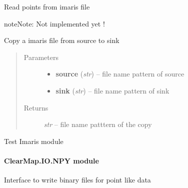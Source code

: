 \documentclass[letterpaper,10pt,english]{sphinxmanual}
\begin{document}

\begin{fulllineitems}
\label{api/ClearMap.IO:ClearMap.IO.Imaris.readPoints}
Read points from imaris file

\begin{notice}{note}{Note:}
Not implemented yet !
\end{notice}

\end{fulllineitems}


\begin{fulllineitems}
\label{api/ClearMap.IO:ClearMap.IO.Imaris.copyData}
Copy a imaris file from source to sink
\begin{quote}\begin{description}
\item[{Parameters}] \leavevmode\begin{itemize}
\item {} 
\textbf{source} (\emph{str}) --
file name pattern of source

\item {} 
\textbf{sink} (\emph{str}) --
file name pattern of sink

\end{itemize}

\item[{Returns}] \leavevmode
\emph{str} --
file name patttern of the copy

\end{description}\end{quote}

\end{fulllineitems}


\begin{fulllineitems}
\label{api/ClearMap.IO:ClearMap.IO.Imaris.test}
Test Imaris module

\end{fulllineitems}



\paragraph{ClearMap.IO.NPY module}
\label{api/ClearMap.IO:clearmap-io-npy-module}\label{api/ClearMap.IO:module-ClearMap.IO.NPY}
Interface to write binary files for point like data
\end{document}
